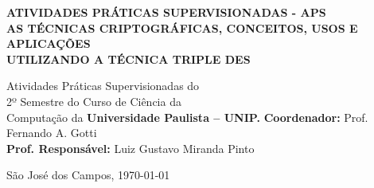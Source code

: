 \begin{titlepage}
    \begin{center}
        {\large\bfseries ATIVIDADES PRÁTICAS SUPERVISIONADAS - APS }\\
        {\bfseries AS TÉCNICAS CRIPTOGRÁFICAS, CONCEITOS, USOS E APLICAÇÕES\\UTILIZANDO A TÉCNICA TRIPLE DES}
    \end{center}
    
    \vfill
    
    \begin{raggedleft}
        Atividades Práticas Supervisionadas do\\2º Semestre do Curso de Ciência da\\Computação da \textbf{Universidade Paulista – UNIP.}
        \vfill
        \textbf{Coordenador:} Prof. Fernando A. Gotti\\\textbf{Prof. Responsável:} Luiz Gustavo Miranda Pinto
        \vfill
    \end{raggedleft}
    
    \begin{center}
        {São José dos Campos, \today}\\[0.4cm]
    \end{center}
\end{titlepage}

\newpage
\renewcommand*\contentsname{Sumário}
\tableofcontents
